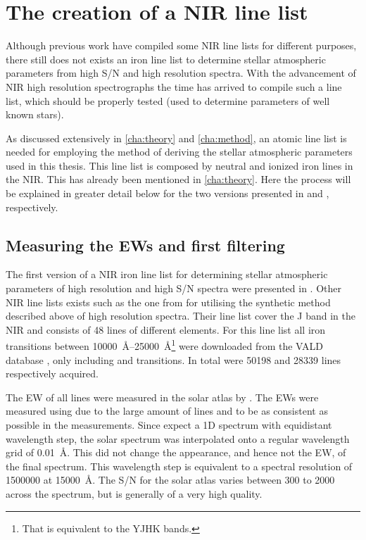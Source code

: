 \section{The creation of a NIR line list}
\label{sec:linelist_first}

Although previous work \citep[see e.g.][]{Onehag2012,Lindgren2016,Shetrone2015} have compiled some
NIR line lists for different purposes, there still does not exists an iron line list to determine
stellar atmospheric parameters from high S/N and high resolution spectra. With the advancement of
NIR high resolution spectrographs the time has arrived to compile such a line list, which should be
properly tested (used to determine parameters of well known stars).

As discussed extensively in \cref{cha:theory} and \cref{cha:method}, an atomic line list is needed
for employing the method of deriving the stellar atmospheric parameters used in this thesis. This
line list is composed by neutral and ionized iron lines in the NIR. This has already been mentioned
in \cref{cha:theory}. Here the process will be explained in greater detail below for the two
versions presented in \citet{Andreasen2016} and \citet{Andreasen2017b}, respectively.


\subsection{Measuring the EWs and first filtering}

The first version of a NIR iron line list for determining stellar atmospheric parameters of high
resolution and high S/N spectra were presented in \citet{Andreasen2016}. Other NIR line lists exists
such as the one from \citet{Onehag2012,Lindgren2016} for utilising the synthetic method described
above of high resolution spectra. Their line list cover the J band in the NIR and consists of 48
lines of different elements. For this line list all iron transitions between
\SIrange{10000}{25000}{\angstrom}\footnote{That is equivalent to the YJHK bands.} were downloaded
from the VALD database \citep{VALD1,VALD2}, only including  and  transitions.
In total were \num{50198}  and \num{28339}  lines respectively acquired.

The EW of all lines were measured in the solar atlas by \citet{Hinkle1995}. The EWs were measured
using  due to the large amount of lines and to be as consistent as possible in the
measurements. Since  expect a 1D spectrum with equidistant wavelength step, the solar
spectrum was interpolated onto a regular wavelength grid of \SI{0.01}{\angstrom}. This did not
change the appearance, and hence not the EW, of the final spectrum. This wavelength step is
equivalent to a spectral resolution of \num{1500000} at \SI{15000}{\angstrom}. The S/N for the solar
atlas varies between 300 to 2000 across the spectrum, but is generally of a very high quality.

